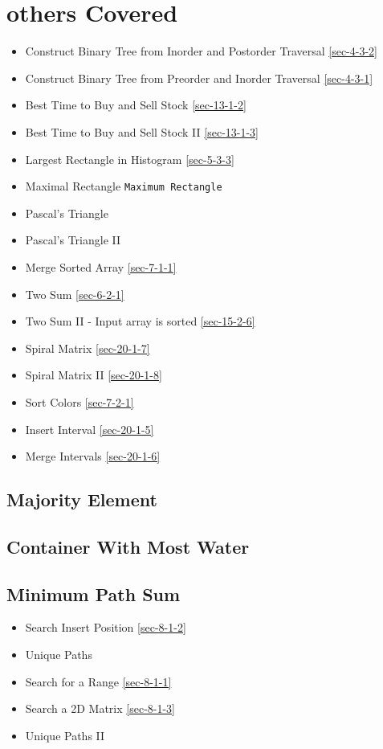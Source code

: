 \documentclass[12pt]{book}
\begin{document}
\section{others Covered}
\label{sec-1-4}
\begin{itemize}
\item Construct Binary Tree from Inorder and Postorder Traversal
\ref{sec-4-3-2}
\item Construct Binary Tree from Preorder and Inorder Traversal
\ref{sec-4-3-1}
\item Best Time to Buy and Sell Stock
\ref{sec-13-1-2}
\item Best Time to Buy and Sell Stock II        
\ref{sec-13-1-3}
\item Largest Rectangle in Histogram
\ref{sec-5-3-3}
\item Maximal Rectangle
\texttt{Maximum Rectangle}
\item Pascal's Triangle
\item Pascal's Triangle II
\item Merge Sorted Array        
\ref{sec-7-1-1}
\item Two Sum
\ref{sec-6-2-1}
\item Two Sum II - Input array is sorted
\ref{sec-15-2-6}
\item Spiral Matrix
\ref{sec-20-1-7}
\item Spiral Matrix II
\ref{sec-20-1-8}
\item Sort Colors
\ref{sec-7-2-1}
\item Insert Interval
\ref{sec-20-1-5}
\item Merge Intervals
\ref{sec-20-1-6}
\end{itemize}
\subsection{Majority Element}
\label{sec-1-4-1}
\subsection{Container With Most Water}
\label{sec-1-4-2}
\subsection{Minimum Path Sum}
\label{sec-1-4-3}
\begin{itemize}
\item Search Insert Position
\ref{sec-8-1-2}
\item Unique Paths
\item Search for a Range
\ref{sec-8-1-1}
\item Search a 2D Matrix
\ref{sec-8-1-3}
\item Unique Paths II
\end{itemize}
\end{document}
